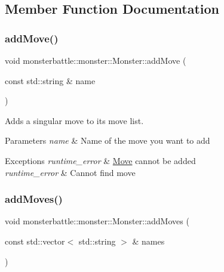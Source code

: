 \subsection{Member Function Documentation}
\mbox{\label{classmonsterbattle_1_1monster_1_1Monster_a4e6f4b3dbba830e6833341d3398c6a52}} 
\subsubsection{\texorpdfstring{add\+Move()}{addMove()}}
{\footnotesize\ttfamily void monsterbattle\+::monster\+::\+Monster\+::add\+Move (\begin{DoxyParamCaption}\item[{const std\+::string \&}]{name }\end{DoxyParamCaption})}



Adds a singular move to its move list. 


\begin{DoxyParams}{Parameters}
{\em name} & Name of the move you want to add\\
\hline
\end{DoxyParams}

\begin{DoxyExceptions}{Exceptions}
{\em runtime\+\_\+error} & \hyperlink{classmonsterbattle_1_1monster_1_1Move}{Move} cannot be added \\
\hline
{\em runtime\+\_\+error} & Cannot find move \\
\hline
\end{DoxyExceptions}
\mbox{\label{classmonsterbattle_1_1monster_1_1Monster_a6beddc490fcac80728ce522fc46b1873}} 
\subsubsection{\texorpdfstring{add\+Moves()}{addMoves()}}
{\footnotesize\ttfamily void monsterbattle\+::monster\+::\+Monster\+::add\+Moves (\begin{DoxyParamCaption}\item[{const std\+::vector$<$ std\+::string $>$ \&}]{names }\end{DoxyParamCaption})}



